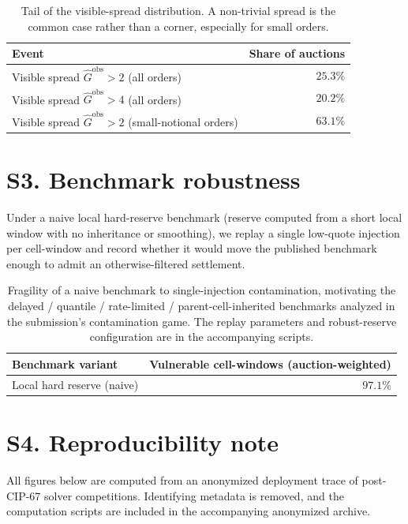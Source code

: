 \documentclass[11pt]{article}
\begin{document}
\begin{table}[h]
\centering
\begin{tabular}{@{}lr@{}}
\toprule
Event & Share of auctions \\
\midrule
Visible spread $\widehat G^{\mathrm{obs}}>2$ (all orders) & $25.3\%$ \\
Visible spread $\widehat G^{\mathrm{obs}}>4$ (all orders) & $20.2\%$ \\
Visible spread $\widehat G^{\mathrm{obs}}>2$ (small-notional orders) & $63.1\%$ \\
\bottomrule
\end{tabular}
\caption{Tail of the visible-spread distribution. A non-trivial spread is
the common case rather than a corner, especially for small orders.}
\end{table}

\section*{S3. Benchmark robustness}

Under a naive local hard-reserve benchmark (reserve computed from a short
local window with no inheritance or smoothing), we replay a single
low-quote injection per cell-window and record whether it would move the
published benchmark enough to admit an otherwise-filtered settlement.

\begin{table}[h]
\centering
\begin{tabular}{@{}lr@{}}
\toprule
Benchmark variant & Vulnerable cell-windows (auction-weighted) \\
\midrule
Local hard reserve (naive) & $97.1\%$ \\
\bottomrule
\end{tabular}
\caption{Fragility of a naive benchmark to single-injection contamination,
motivating the delayed / quantile / rate-limited / parent-cell-inherited
benchmarks analyzed in the submission's contamination game. The replay
parameters and robust-reserve configuration are in the accompanying
scripts.}
\end{table}

\section*{S4. Reproducibility note}

All figures below are computed from an anonymized deployment trace of
post-CIP-67 solver competitions. Identifying metadata is removed, and the
computation scripts are included in the accompanying anonymized archive.
\end{document}
